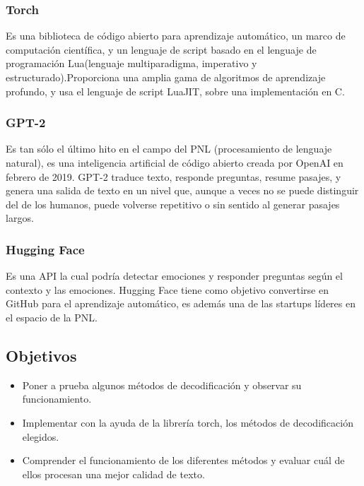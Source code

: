 \documentclass[10pt,twocolumn]{article}
\theoremstyle{definition}
\begin{document}
\subsubsection{Torch}
Es una biblioteca de código abierto para aprendizaje automático, un marco de computación científica, y un lenguaje de script basado en el lenguaje de programación Lua(lenguaje multiparadigma, imperativo y estructurado).Proporciona una amplia gama de algoritmos de aprendizaje profundo, y usa el lenguaje de script LuaJIT, sobre una implementación en C.

\subsubsection{GPT-2}
Es tan sólo el último hito en el campo del PNL (procesamiento de lenguaje natural), es una inteligencia artificial de código abierto creada por OpenAI en febrero de 2019. GPT-2 traduce texto, responde preguntas, resume pasajes, y genera una salida de texto en un nivel que, aunque a veces no se puede distinguir del de los humanos,  puede volverse repetitivo o sin sentido al generar pasajes largos.

\subsubsection{Hugging Face}
Es una API la cual podría detectar emociones y responder preguntas según el contexto y las emociones. Hugging Face tiene como objetivo convertirse en GitHub para el aprendizaje automático, es además una de las startups líderes en el espacio de la PNL.

\subsection{Objetivos}
\begin{itemize}
    \item Poner a prueba algunos métodos de decodificación y observar su funcionamiento.
    \item Implementar con la ayuda de la librería torch, los métodos de decodificación elegidos.
    \item Comprender el funcionamiento de los diferentes métodos y evaluar cuál de ellos procesan una mejor calidad de texto.   

\end{itemize}
\end{document}

